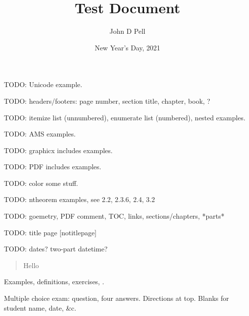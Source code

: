 \documentclass[12pt]{gWmaths}
\author{John D Pell}
\title{Test Document}
\date{New Year's Day, 2021}
\begin{document}
\maketitle

TODO: Unicode example.

TODO: headers/footers: page number, section title, chapter, book, ?

TODO: itemize list (unnumbered), enumerate list (numbered), nested examples.

TODO: AMS examples. 

TODO: graphicx includes examples.

TODO: PDF includes examples.

TODO: color some stuff. 

TODO: ntheorem examples, see 2.2, 2.3.6, 2.4, 3.2

TODO: goemetry, PDF comment, TOC, links, sections/chapters, *parts*

TODO: title page [notitlepage] 

TODO: dates? two-part datetime?

\blockquote{Hello}. %


Examples, definitions, exercises, . 


Multiple choice exam: question, four answers. Directions at top. Blanks for student name, date, \&c. 
\end{document}
